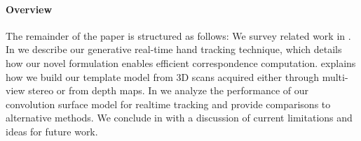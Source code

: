 %

\paragraph{Overview}
The remainder of the paper is structured as follows: We survey related work in . In  we describe our generative real-time hand tracking technique, which details how our novel formulation enables efficient correspondence computation.
% 
 explains how we build our template model from 3D scans acquired either through multi-view stereo or from depth maps.
% 
In  we analyze the performance of our convolution surface model for realtime tracking and provide comparisons to alternative methods. 
% 
We conclude in  with a discussion of current limitations and ideas for future work.




